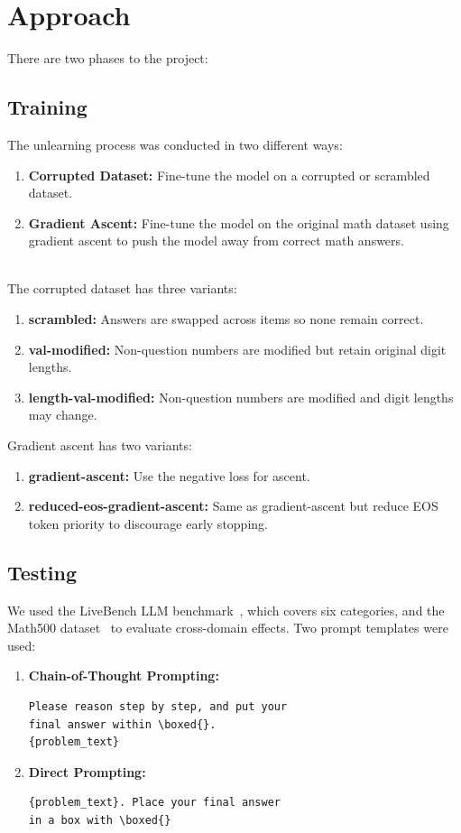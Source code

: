 \documentclass[10.5pt]{article}
\begin{document}
\section{Approach}
There are two phases to the project:

\subsection{Training}
The unlearning process was conducted in two different ways:
\begin{enumerate}
    \item \textbf{Corrupted Dataset:} Fine-tune the model on a corrupted or scrambled dataset.
    \item \textbf{Gradient Ascent:} Fine-tune the model on the original math dataset using gradient ascent to push the model away from correct math answers.
\end{enumerate}
\\
The corrupted dataset has three variants:
\begin{enumerate}
    \item \textbf{scrambled:} Answers are swapped across items so none remain correct.
    \item \textbf{val-modified:} Non-question numbers are modified but retain original digit lengths.
    \item \textbf{length-val-modified:} Non-question numbers are modified and digit lengths may change.
\end{enumerate}

Gradient ascent has two variants:
\begin{enumerate}
    \item \textbf{gradient-ascent:} Use the negative loss for ascent.
    \item \textbf{reduced-eos-gradient-ascent:} Same as gradient-ascent but reduce EOS token priority to discourage early stopping.
\end{enumerate}
\subsection{Testing}
We used the LiveBench LLM benchmark~\cite{livebench}, which covers six categories, and the Math500 dataset~\cite{lightman2023lets} to evaluate cross-domain effects. Two prompt templates were used:
\begin{enumerate}
    \item \textbf{Chain-of-Thought Prompting:}
    \begin{verbatim}
Please reason step by step, and put your 
final answer within \boxed{}.
{problem_text}
    \end{verbatim}
    \item \textbf{Direct Prompting:}
    \begin{verbatim}
{problem_text}. Place your final answer 
in a box with \boxed{}
    \end{verbatim}
\end{enumerate}
\end{document}
